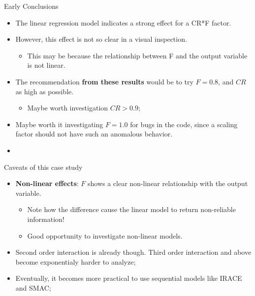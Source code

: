 \begin{frame}[t]{Early Conclusions}
  \begin{itemize}
  \item The linear regression model indicates a strong effect for a CR*F factor.\medskip
    
  \item However, this effect is not so clear in a visual inspection.
    \begin{itemize}
    \item This may be because the relationship between F and the
      output variable is not linear.
    \end{itemize}\medskip
    
  \item The recommendation {\bf from these results} would be to try
    $F=0.8$, and $CR$ as high as possible.
    \begin{itemize}
    \item Maybe worth investigation $CR > 0.9$;
    \end{itemize}\medskip
    
  \item Maybe worth it investigating $F = 1.0$ for bugs in the code,
    since a scaling factor should not have such an anomalous behavior.
    \bigskip
    
  \item {}
    
  \end{itemize}
\end{frame}

\begin{frame}[t]{Caveats of this case study}{}
  \begin{itemize}
  \item {\bf Non-linear effects}: $F$ shows a clear non-linear
    relationship with the output variable.
    \begin{itemize}
    \item Note how the difference cause the linear model to return
      non-reliable information!
    \item Good opportunity to investigate non-linear models.
    \end{itemize}\bigskip

  \item Second order interaction is already though. Third order
    interaction and above become exponentialy harder to analyze;
    \bigskip

  \item Eventually, it becomes more practical to use sequential models
    like IRACE and SMAC;
  \end{itemize}
\end{frame}


